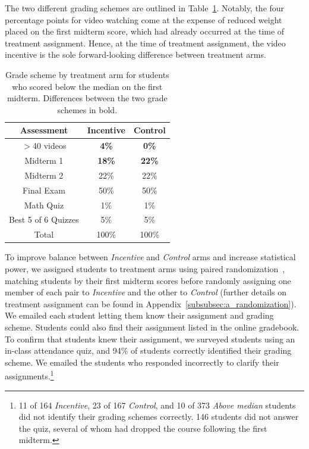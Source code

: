 \documentclass[12pt]{article}
\begin{document}
The two different grading schemes are outlined in Table~\ref{tab:gradescheme}.
Notably, the four percentage points for video watching come at the expense of reduced weight placed on the first midterm score, which had already occurred at the time of treatment assignment.
Hence, at the time of treatment assignment, the video incentive is the sole forward-looking difference between treatment arms.

\begin{table}
	\caption{Grade scheme by treatment arm for students who scored below the median on the first midterm. Differences between the two grade schemes in bold.}
	\centering
	\begin{tabular}{ c|c|c }
		Assessment & Incentive & Control \\
		\hline
		$>$40 videos & \textbf{4\%} & \textbf{0\%} \\
		Midterm 1 & \textbf{18\%} & \textbf{22\%} \\
		Midterm 2 & 22\% & 22\% \\
		Final Exam & 50\% & 50\% \\
		Math Quiz & 1\% & 1\% \\
		Best 5 of 6 Quizzes & 5\% & 5\% \\
		\hline
		Total & 100\% & 100\% \\
	\end{tabular}
	\label{tab:gradescheme}
\end{table}

To improve balance between \textit{Incentive} and \textit{Control} arms and increase statistical power, we assigned students to treatment arms using paired randomization~\parencite{ai2017}, matching students by their first midterm scores before randomly assigning one member of each pair to \textit{Incentive} and the other to \textit{Control} (further details on treatment assignment can be found in Appendix~\ref{subsubsec:a_randomization}).
We emailed each student letting them know their assignment and grading scheme.
Students could also find their assignment listed in the online gradebook.
To confirm that students knew their assignment, we surveyed students using an in-class attendance quiz, and 94\% of students correctly identified their grading scheme.
We emailed the students who responded incorrectly to clarify their assignments.\footnote{11 of 164 \textit{Incentive}, 23 of 167 \textit{Control}, and 10 of 373 \textit{Above median} students did not identify their grading schemes correctly. 146 students did not answer the quiz, several of whom had dropped the course following the first midterm.}
\end{document}
